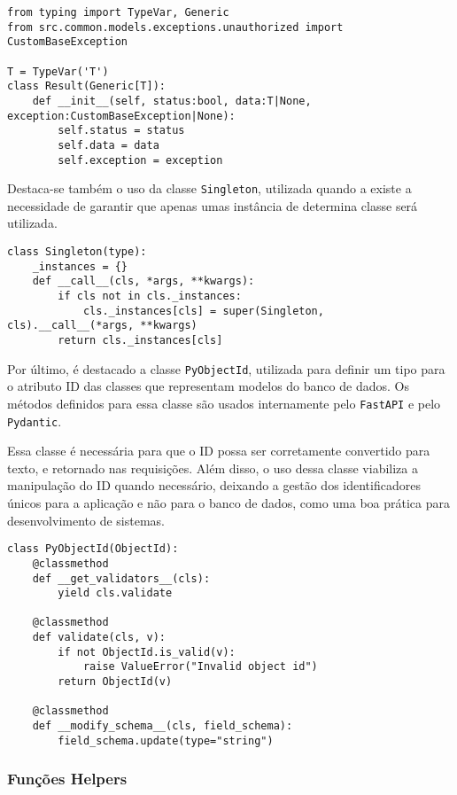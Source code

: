 \begin{verbatim}
from typing import TypeVar, Generic
from src.common.models.exceptions.unauthorized import CustomBaseException

T = TypeVar('T')
class Result(Generic[T]):
    def __init__(self, status:bool, data:T|None, exception:CustomBaseException|None):
        self.status = status
        self.data = data
        self.exception = exception
\end{verbatim}

Destaca-se também o uso da classe \texttt{Singleton}, utilizada quando a existe a necessidade de garantir que apenas umas instância de determina classe será utilizada.

\begin{verbatim}
class Singleton(type):
    _instances = {}
    def __call__(cls, *args, **kwargs):
        if cls not in cls._instances:
            cls._instances[cls] = super(Singleton, cls).__call__(*args, **kwargs)
        return cls._instances[cls]
\end{verbatim}

Por último, é destacado a classe \texttt{PyObjectId}, utilizada para definir um tipo para o atributo ID das classes que representam modelos do banco de dados. Os métodos definidos para essa classe são usados internamente pelo \texttt{FastAPI} e pelo \texttt{Pydantic}.

Essa classe é necessária para que o ID possa ser corretamente convertido para texto, e retornado nas requisições. Além disso, o uso dessa classe viabiliza a manipulação do ID quando necessário, deixando a gestão dos identificadores únicos para a aplicação e não para o banco de dados, como uma boa prática para desenvolvimento de sistemas.

\begin{verbatim}
class PyObjectId(ObjectId):
    @classmethod
    def __get_validators__(cls):
        yield cls.validate

    @classmethod
    def validate(cls, v):
        if not ObjectId.is_valid(v):
            raise ValueError("Invalid object id")
        return ObjectId(v)

    @classmethod
    def __modify_schema__(cls, field_schema):
        field_schema.update(type="string")
\end{verbatim}

\subsubsection{Funções Helpers}

